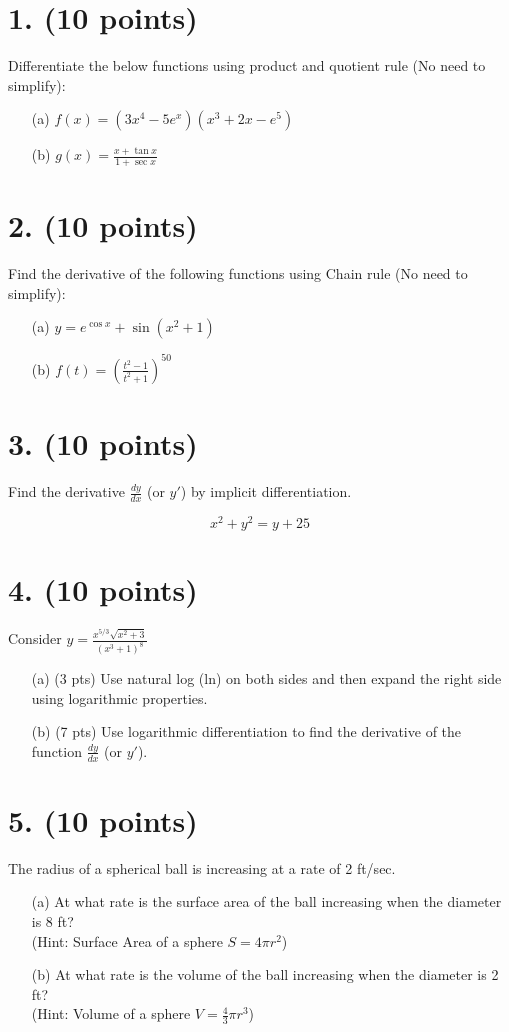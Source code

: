 \section*{1. (10 points)}
Differentiate the below functions using product and quotient rule (No need to simplify):
\begin{enumerate}
    \item[(a)] \( f(x) = (3x^4 - 5e^x)(x^3 + 2x - e^5) \)
    \item[(b)] \( g(x) = \frac{x + \tan x}{1 + \sec x} \)
\end{enumerate}

\section*{2. (10 points)}
Find the derivative of the following functions using Chain rule (No need to simplify):
\begin{enumerate}
    \item[(a)] \( y = e^{\cos x} + \sin(x^2 + 1) \)
    \item[(b)] \( f(t) = \left( \frac{t^2 - 1}{t^2 + 1} \right)^{50} \)
\end{enumerate}

\section*{3. (10 points)}
Find the derivative \( \frac{dy}{dx} \) (or \( y' \)) by implicit differentiation.

\[
x^2 + y^2 = y + 25
\]

\section*{4. (10 points)}
Consider \( y = \frac{x^{5/3} \sqrt{x^2 + 3}}{(x^3 + 1)^8} \)
\begin{enumerate}
    \item[(a)] (3 pts) Use natural log (ln) on both sides and then expand the right side using logarithmic properties.
    \item[(b)] (7 pts) Use logarithmic differentiation to find the derivative of the function \( \frac{dy}{dx} \) (or \( y' \)).
\end{enumerate}

\section*{5. (10 points)}
The radius of a spherical ball is increasing at a rate of 2 ft/sec.
\begin{enumerate}
    \item[(a)] At what rate is the surface area of the ball increasing when the diameter is 8 ft? \\
    (Hint: Surface Area of a sphere \( S = 4\pi r^2 \))
    \item[(b)] At what rate is the volume of the ball increasing when the diameter is 2 ft? \\
    (Hint: Volume of a sphere \( V = \frac{4}{3}\pi r^3 \))
\end{enumerate}

